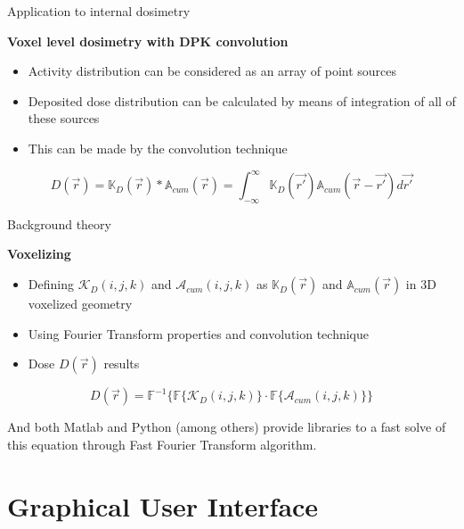 \documentclass[ignorenonframetext,]{beamer}
\begin{document}
\begin{frame}{Application to internal dosimetry}
\protect\hypertarget{application-to-internal-dosimetry}{}

\textbf{Voxel level dosimetry with DPK convolution}

\begin{itemize}
\item
  Activity distribution can be considered as an array of point sources
\item
  Deposited dose distribution can be calculated by means of integration
  of all of these sources
\item
  This can be made by the convolution technique
\end{itemize}

\begin{equation}
D(\vec{r}) = \mathbb{K}_{D}(\vec{r}) \ast \mathbb{A}_{cum}(\vec{r}) = \int_{-\infty}^{\infty} \mathbb{K}_{D}(\vec{r'}) \mathbb{A}_{cum}(\vec{r} - \vec{r'}) d\vec{r'}
\end{equation}

\end{frame}

\begin{frame}{Background theory}
\protect\hypertarget{background-theory}{}

\textbf{Voxelizing}

\begin{itemize}
\item
  Defining \(\mathcal{K}_D(i,j,k)\) and \(\mathcal{A}_{cum}(i,j,k)\) as
  \(\mathbb{K}_{D}(\vec{r})\) and \(\mathbb{A}_{cum}(\vec{r})\) in 3D
  voxelized geometry
\item
  Using Fourier Transform properties and convolution technique
\item
  Dose \(D(\vec{r})\) results
\end{itemize}

\begin{equation}
D(\vec{r}) = \mathbb{F}^{-1}\{\mathbb{F}\{\mathcal{K}_{D}(i,j,k)\} \cdot \mathbb{F}\{\mathcal{A}_{cum}(i,j,k)\}\}
\end{equation}

And both Matlab and Python (among others) provide libraries to a fast
solve of this equation through Fast Fourier Transform algorithm.

\end{frame}

\hypertarget{graphical-user-interface}{%
\section{Graphical User Interface}\label{graphical-user-interface}}
\end{document}
